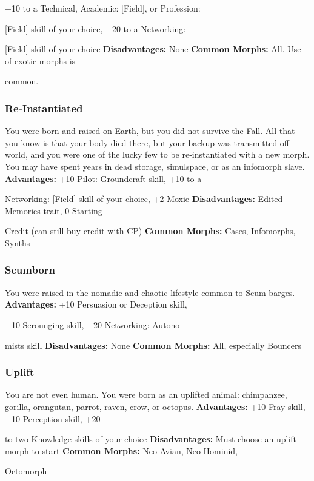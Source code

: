 +10 to a Technical, Academic: [Field], or Profession: 

[Field] skill of your choice, +20 to a Networking: 

[Field] skill of your choice
\textbf{Disadvantages:} None
\textbf{Common Morphs:} All. Use of exotic morphs is 

common.

\subsubsection{Re-Instantiated}

You were born and raised on Earth, but you did not 
survive the Fall. All that you know is that your body 
died there, but your backup was transmitted off-world, 
and you were one of the lucky few to be re-instantiated 
with a new morph. You may have spent years in dead 
storage, simulspace, or as an infomorph slave.
\textbf{Advantages:  }+10 Pilot: Groundcraft skill, +10 to a 

Networking: [Field] skill of your choice, +2 Moxie
\textbf{Disadvantages:} Edited Memories trait, 0 Starting 

Credit (can still buy credit with CP)
\textbf{Common Morphs:} Cases, Infomorphs, Synths

\subsubsection{Scumborn}

You were raised in the nomadic and chaotic lifestyle 
common to Scum barges.
\textbf{Advantages:} +10 Persuasion or Deception skill, 

+10 Scrounging skill, +20 Networking: Autono-

mists skill
\textbf{Disadvantages:} None
\textbf{Common Morphs:} All, especially Bouncers

\subsubsection{Uplift}

You are not even human. You were born as an uplifted 
animal: chimpanzee, gorilla, orangutan, parrot, raven, 
crow, or octopus.
\textbf{Advantages:} +10 Fray skill, +10 Perception skill, +20 

to two Knowledge skills of your choice
\textbf{Disadvantages:} Must choose an uplift morph to start
\textbf{Common Morphs:} Neo-Avian, Neo-Hominid, 

Octomorph

